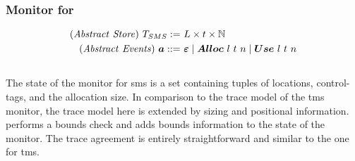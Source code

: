 \documentclass[dvipsnames,conference]{IEEEtran}
\theoremstyle{definition}
\begin{document}

\subsubsection{Monitor for }\label{subsubsec:sms}
\begin{gather*}
  \begin{aligned}
    \mi{(Abstract\ Store)}~\smsmonitor:=&\ L\times\sandboxtag\times\mb{N}\\
    \mi{(Abstract\ Events)}~\absevent\bnfdef&\ \absev{\varepsilon} \mid \absev{Alloc\ }\loc\ \sandboxtag\ n \mid \absev{Use\ }\loc\ \sandboxtag\ n \\
  \end{aligned}
\end{gather*}
\begin{center}
  $\;$\\
\end{center}
The state of the monitor for \gls*{sms} is a set containing tuples of locations, control-tags, and the allocation size.
In comparison to the trace model of the \gls*{tms} monitor, the trace model here is extended by sizing and positional information.
 performs a bounds check and  adds bounds information to the state of the monitor.
The trace agreement is entirely straightforward and similar to the one for \gls*{tms}.
\end{document}
